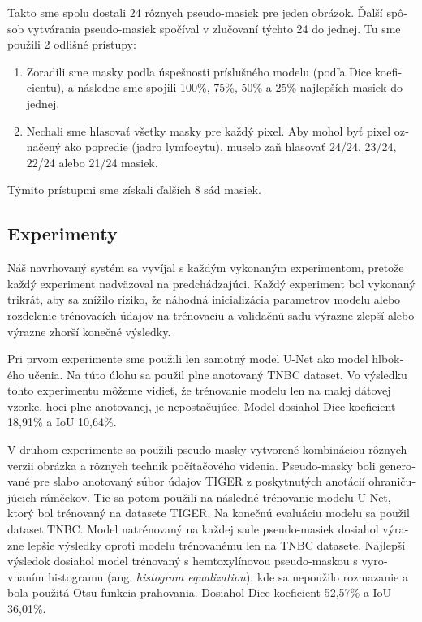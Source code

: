 \begin{otherlanguage}{slovak}
Takto sme spolu dostali 24 rôznych pseudo-masiek pre jeden obrázok. Ďalší spôsob vytvárania pseudo-masiek spočíval v zlučovaní týchto 24 do jednej. Tu sme použili 2 odlišné prístupy:

\begin{enumerate}
    \item Zoradili sme masky podľa úspešnosti príslušného modelu (podľa Dice koeficientu), a následne sme spojili 100\%, 75\%, 50\% a 25\% najlepších masiek do jednej.
    \item Nechali sme hlasovať všetky masky pre každý pixel. Aby mohol byť pixel označený ako popredie (jadro lymfocytu), muselo zaň hlasovať 24/24, 23/24, 22/24 alebo 21/24 masiek.
\end{enumerate}

Týmito prístupmi sme získali ďalších 8 sád masiek.

\subsection{Experimenty}
Náš navrhovaný systém sa vyvíjal s každým vykonaným experimentom, pretože každý experiment nadväzoval na predchádzajúci. Každý experiment bol vykonaný trikrát, aby sa znížilo riziko, že náhodná inicializácia parametrov modelu alebo rozdelenie trénovacích údajov na trénovaciu a validačnú sadu výrazne zlepší alebo výrazne zhorší konečné výsledky.

Pri prvom experimente sme použili len samotný model U-Net ako model hlbokého učenia. Na túto úlohu sa použil plne anotovaný TNBC dataset. Vo výsledku tohto experimentu môžeme vidieť, že trénovanie modelu len na malej dátovej vzorke, hoci plne anotovanej, je nepostačujúce. Model dosiahol Dice koeficient 18,91\% a IoU 10,64\%.

V druhom experimente sa použili pseudo-masky vytvorené kombináciou rôznych verzii obrázka a rôznych techník počítačového videnia. Pseudo-masky boli generované pre slabo anotovaný súbor údajov TIGER z poskytnutých anotácií ohraničujúcich rámčekov. Tie sa potom použili na následné trénovanie modelu U-Net, ktorý bol trénovaný na datasete TIGER. Na konečnú evaluáciu modelu sa použil dataset TNBC. Model natrénovaný na každej sade pseudo-masiek dosiahol výrazne lepšie výsledky oproti modelu trénovanému len na TNBC datasete. Najlepší výsledok dosiahol model trénovaný s hemtoxylínovou pseudo-maskou s vyrovnaním histogramu (ang. \textit{histogram equalization}), kde sa nepoužilo rozmazanie a bola použitá Otsu funkcia prahovania. Dosiahol Dice koeficient 52,57\% a IoU 36,01\%.


\end{otherlanguage}
